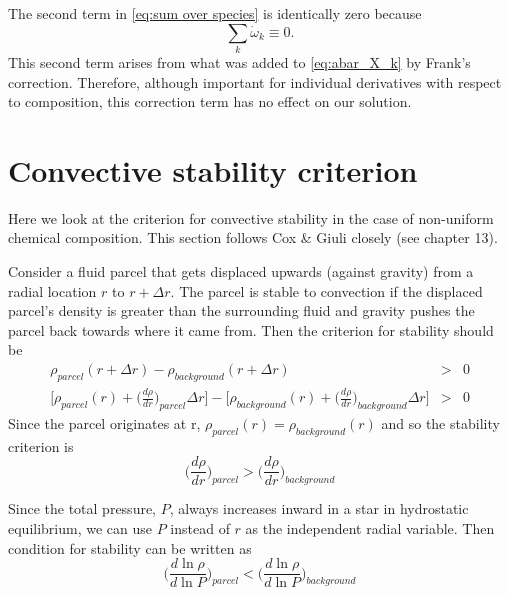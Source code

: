 The second term in \eqref{eq:sum over species} is identically zero because
\[
\sum_k \dot{\omega}_k \equiv 0.
\]
This second term arises from what was added to \eqref{eq:abar_X_k} by 
Frank's correction.  Therefore, although important for individual derivatives
with respect to composition, this correction term has no effect on our 
solution.

\section{Convective stability criterion}

Here we look at the criterion for convective stability in the case of 
non-uniform chemical composition.  This section follows Cox \& Giuli 
\cite{cg-ed2} closely (see chapter 13).  

Consider a fluid parcel that gets displaced upwards (against gravity) from
a radial location $r$ to $r + \Delta r$.  
The parcel is stable to convection if the displaced parcel's density is 
greater than 
the surrounding fluid and gravity pushes the parcel back towards where it came
from.  Then the criterion for stability should be
\begin{eqnarray}
 \rho_{parcel}(r+\Delta r) - \rho_{background}(r + \Delta r) &>& 0 \\
 \bigg[\rho_{parcel}(r) + \bigg(\frac{d\rho}{dr}\bigg)_{parcel}\Delta r\bigg] - 
 \bigg[\rho_{background}(r) + \bigg(\frac{d\rho}{dr}\bigg)_{background}\Delta r\bigg] &>& 0 
\end{eqnarray}
Since the parcel originates at r, $\rho_{parcel}(r) = \rho_{background}(r)$ and
so the stability criterion is
\begin{equation}
 \bigg(\frac{d\rho}{dr}\bigg)_{parcel} > \bigg(\frac{d\rho}{dr}\bigg)_{background}
\label{eqn:basicStability}
\end{equation}

Since the total pressure, $P$, always increases inward in a star in hydrostatic
equilibrium, we can use $P$ instead of $r$ as the independent radial variable.  
Then condition for stability can be written as
\[
 \bigg( \frac{d \ln \rho}{d \ln P}\bigg )_{parcel} < \bigg(\frac{d \ln \rho}{d \ln P}\bigg)_{background}
\]

